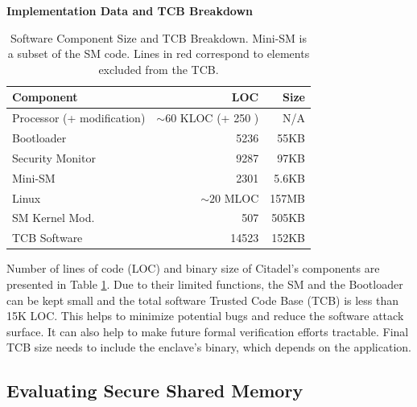 \noindent\textbf{Implementation Data and TCB Breakdown}
\begin{table}
    \centering
    \begin{tabular}{|p{2.35cm}|r|r|}
        \hline
         Component & LOC & Size\\
         \hline\hline
         Processor \cite{bourgeat2019mi6} (+ modification) & $\sim60$ KLOC (+ 250 ) & N/A \\
         \hline
         Bootloader & 5236 & 55KB\\
         \hline
         Security Monitor & 9287 & 97KB\\
         \hline
         \rowcolor{LightRedbis}
         Mini-SM & 2301 & 5.6KB\\
         \hline
         \rowcolor{LightRed}
         Linux & $\sim20$ MLOC & 157MB\\
         \hline
         \rowcolor{LightRed}
         SM Kernel Mod. & 507 & 505KB\\
         \hline
         \hline
         TCB Software & 14523 & 152KB \\
         \hline
    \end{tabular}
    \vspace{0.40cm}
    \caption{Software Component Size and TCB Breakdown. Mini-SM is a subset of the SM code. 
    Lines in red correspond to elements excluded from the TCB.}
    \label{tab:tcbloc}
\end{table}
Number of lines of code (LOC) and binary size of Citadel's components are presented in Table \ref{tab:tcbloc}.
Due to their limited functions, the SM and the Bootloader can be kept small and the total software Trusted Code Base (TCB) is less than 15K LOC.
This helps to minimize potential bugs and reduce the software attack surface.
It can also help to make future formal verification efforts tractable.
Final TCB size needs to include the enclave's binary, which depends on the application. 

\subsection{Evaluating Secure Shared Memory}
\label{sec:evalsharedmemory}

